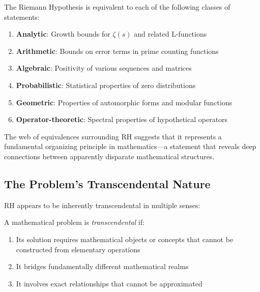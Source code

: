 \begin{theorem}
The Riemann Hypothesis is equivalent to each of the following classes of statements:
\begin{enumerate}
\item \textbf{Analytic}: Growth bounds for $\zeta(s)$ and related L-functions
\item \textbf{Arithmetic}: Bounds on error terms in prime counting functions  
\item \textbf{Algebraic}: Positivity of various sequences and matrices
\item \textbf{Probabilistic}: Statistical properties of zero distributions
\item \textbf{Geometric}: Properties of automorphic forms and modular functions
\item \textbf{Operator-theoretic}: Spectral properties of hypothetical operators
\end{enumerate}
\end{theorem}

\begin{insight}
The web of equivalences surrounding RH suggests that it represents a fundamental organizing principle in mathematics—a statement that reveals deep connections between apparently disparate mathematical structures.
\end{insight}

\subsection{The Problem's Transcendental Nature}
\label{subsec:transcendental_nature}

RH appears to be inherently transcendental in multiple senses:

\begin{definition}
A mathematical problem is \emph{transcendental} if:
\begin{enumerate}
\item Its solution requires mathematical objects or concepts that cannot be constructed from elementary operations
\item It bridges fundamentally different mathematical realms
\item It involves exact relationships that cannot be approximated
\end{enumerate}
\end{definition}

